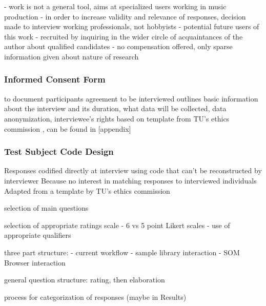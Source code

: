 - work is not a general tool, aims at specialized users working in music
production
- in order to increase validity and relevance of responses, decision made
to interview working professionals, not hobbyists
- potential future users of this work
- recruited by inquiring in the wider circle
of acquaintances of the author about qualified candidates
- no compensation offered, only sparse information given about nature of
research

\subsubsection{Informed Consent Form}
\label{subsubsec:consent_form}

to document participants agreement to be interviewed
outlines basic information about the interview and its duration, what data will
be collected, data anonymization, interviewee's rights
based on template from TU's ethics commission \citep{web:ethics2019}, can be
found in [appendix]

\subsubsection{Test Subject Code Design}
\label{subsubsec:subject_code}

Responses codified directly at interview using code that can't be reconstructed
by interviewer
Because no interest in matching responses to interviewed individuals
Adapted from a template by TU's ethics commission \citep{web:ethics2019}

\bigskip
selection of main questions

\bigskip
selection of appropriate ratings scale
- 6 vs 5 point Likert scales
- use of appropriate qualifiers

\bigskip
three part structure:
- current workflow
- sample library interaction
- SOM Browser interaction

general question structure: rating, then elaboration

\bigskip
process for categorization of responses (maybe in Results)
